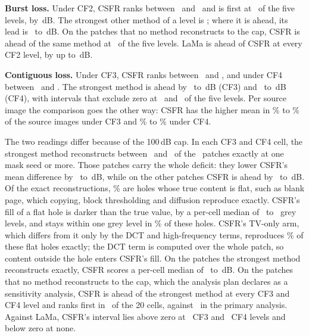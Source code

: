 \documentclass[final,3p]{elsarticle}
\begin{document}
\textbf{Burst loss.} Under CF2, CSFR ranks between \qGovCFtwoRankMin\ and \qGovCFtwoRankMax\ and is first at \qGovCFtwoNFirst\ of the five levels, by \qGovCFtwoAheadMax\,dB. The strongest other method of a level is \qGovCFtwoStrongest; where it is ahead, its lead is \qGovCFtwoBehindMin\ to \qGovCFtwoBehindMax\,dB. On the patches that no method reconstructs to the cap, CSFR is ahead of the same method at \qGovCFtwoCapfreeNAhead\ of the five levels. LaMa is ahead of CSFR at every CF2 level, by up to \qGovCFtwoLamaBehindMax\,dB.

\textbf{Contiguous loss.} Under CF3, CSFR ranks between \qGovCFthreeRankMin\ and \qGovCFthreeRankMax, and under CF4 between \qGovCFfourRankMin\ and \qGovCFfourRankMax. The strongest method is ahead by \qGovCFthreeBehindMin\ to \qGovCFthreeBehindMax\,dB (CF3) and \qGovCFfourBehindMin\ to \qGovCFfourBehindMax\,dB (CF4), with intervals that exclude zero at \qGovCFthreeNBehindSig\ and \qGovCFfourNBehindSig\ of the five levels. Per source image the comparison goes the other way: CSFR has the higher mean in \qGovCFthreeLedMin\% to \qGovCFthreeLedMax\% of the source images under CF3 and \qGovCFfourLedMin\% to \qGovCFfourLedMax\% under CF4.

The two readings differ because of the 100\,dB cap. In each CF3 and CF4 cell, the strongest method reconstructs between \mechContigCappedMin\ and \mechContigCappedMax\ of the \corpusGovN\ patches exactly at one mask seed or more. Those patches carry the whole deficit: they lower CSFR's mean difference by \mechContigCapPartMin\ to \mechContigCapPartMax\,dB, while on the other patches CSFR is ahead by \mechContigRestMin\ to \mechContigRestMax\,dB. Of the exact reconstructions, \mechContigFlatShare\% are holes whose true content is flat, such as blank page, which copying, block thresholding and diffusion reproduce exactly. CSFR's fill of a flat hole is darker than the true value, by a per-cell median of \mechContigBiasMin\ to \mechContigBiasMax\ grey levels, and stays within one grey level in \mechContigWithinShare\% of these holes. CSFR's TV-only arm, which differs from it only by the DCT and high-frequency terms, reproduces \mechContigTvExactShare\% of these flat holes exactly; the DCT term is computed over the whole patch, so content outside the hole enters CSFR's fill. On the patches the strongest method reconstructs exactly, CSFR scores a per-cell median of \mechContigCsfrPsnrMin\ to \mechContigCsfrPsnrMax\,dB. On the patches that no method reconstructs to the cap, which the analysis plan declares as a sensitivity analysis, CSFR is ahead of the strongest method at every CF3 and CF4 level and ranks first in \qGovCapfreeNFirst\ of the 20 cells, against \qGovNFirst\ in the primary analysis. Against LaMa, CSFR's interval lies above zero at \qGovCFthreeNLamaAheadSig\ CF3 and \qGovCFfourNLamaAheadSig\ CF4 levels and below zero at none.
\end{document}
